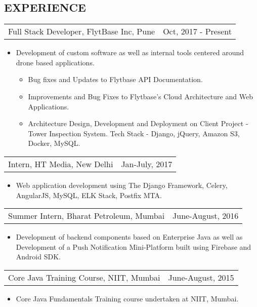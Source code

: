 \documentclass[margin]{res}
\begin{document}
\begin{resume}
\section{EXPERIENCE}      
                  \begin{tabular}{p{3.5in} r} %
                  Full Stack Developer, FlytBase Inc, Pune & Oct, 2017 - Present
                  \end{tabular}	
                   \begin{itemize} %
                    \item[] Development of custom software as well as internal tools centered around drone based applications.
                    \begin{itemize}
                      \item Bug fixes and Updates to Flytbase API Documentation.
                      \item Improvements and Bug Fixes to Flytbase's Cloud Architecture and Web Applications.
                      \item Architecture Design, Development and Deployment on Client Project - Tower Inspection System. Tech Stack - Django, jQuery, Amazon S3, Docker, MySQL.
                    \end{itemize}
       \end{itemize} 
        \begin{tabular}{p{3.5in} r}
                Intern, HT Media, New Delhi & Jan-July, 2017  
        \end{tabular}	
		  \begin{itemize}
                   \item[] Web application development using The Django Framework, Celery, AngularJS, MySQL, ELK Stack, Postfix MTA. 
                  \end{itemize}
                 \begin{tabular}{p{3.5in} r} %
                  Summer Intern, Bharat Petroleum, Mumbai &  June-August, 2016
                 \end{tabular}
                  \begin{itemize}
                   \item[] Development of backend components based on Enterprise Java as well as Development of a Push Notification Mini-Platform built using Firebase and Android SDK.
                  \end{itemize}
                 \begin{tabular}{p{3.5in} r} %
                  Core Java Training Course, NIIT, Mumbai & June-August, 2015
                 \end{tabular}
                  \begin{itemize}
                   \item[] Core Java Fundamentals Training course undertaken at NIIT, Mumbai.
                  \end{itemize}


\end{resume}
\end{document}
